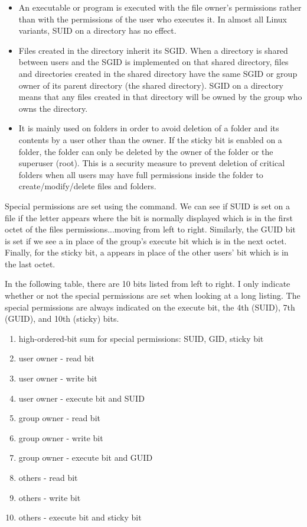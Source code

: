 \begin{itemize}
	\item {}An executable or program is executed with the file owner's permissions rather than with the permissions of the user who executes it. In almost all Linux variants, SUID on a directory has no effect.
	\item {}Files created in the directory inherit its SGID. When a directory is shared between users and the SGID is implemented on that shared directory, files and directories created in the shared directory have the same SGID or group owner of its parent directory (the shared directory). SGID on a directory means that any files created in that directory will be owned by the group who owns the directory. 
	\item {}It is mainly used on folders in order to avoid deletion of a folder and its contents by a user other than the owner. If the sticky bit is enabled on a folder, the folder can only be deleted by the owner of the folder or the superuser (root). This is a security measure to prevent deletion of critical folders when all users may have full permissions inside the folder to create/modify/delete files and folders.
\end{itemize}

Special permissions are set using the  command. We can see if SUID is set on a file if the letter  appears where the  bit is normally displayed which is in the first octet of the files permissions...moving from left to right. Similarly, the GUID bit is set if we see a  in place of the group's execute  bit which is in the next octet. Finally, for the sticky bit, a  appears in place of the other users'  bit which is in the last octet.

In the following table, there are 10 bits listed from left to right. I only indicate whether or not the special permissions are set when looking at a long listing. The special permissions are always indicated on the execute bit, the 4th (SUID), 7th (GUID), and 10th (sticky) bits.\\
\begin{enumerate}
\item{high-ordered-bit sum for special permissions: SUID, GID, sticky bit}
\item{user owner - read bit}
\item{user owner - write bit}
\item{user owner - execute bit and SUID}
\item{group owner - read bit}
\item{group owner - write bit}
\item{group owner - execute bit and GUID}
\item{others - read bit}
\item{others - write bit}
\item{others - execute bit and sticky bit}
\end{enumerate}

